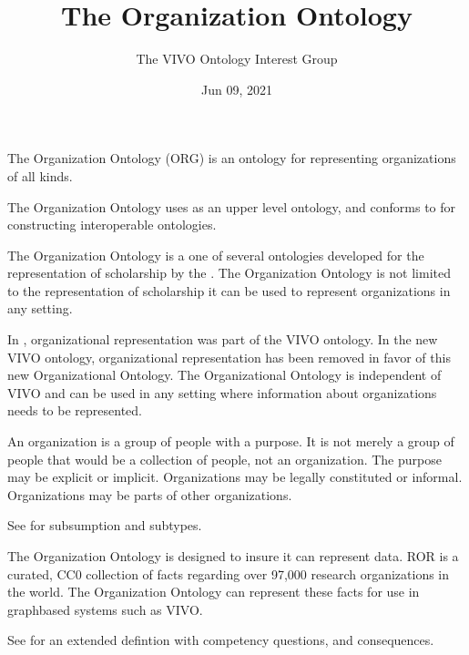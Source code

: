 \documentclass[letterpaper,10pt,english]{sphinxmanual}
\title{The Organization Ontology}
\date{Jun 09, 2021}
\author{The VIVO Ontology Interest Group}
\begin{document}
\pagestyle{empty}
\sphinxmaketitle
\pagestyle{plain}
\sphinxtableofcontents
\pagestyle{normal}
\label{\detokenize{index::doc}}


\sphinxAtStartPar
The Organization Ontology (ORG) is an ontology for
representing organizations of all kinds.

\sphinxAtStartPar
The Organization Ontology uses  as an upper level ontology, and conforms to
 for constructing interoperable ontologies.

\sphinxAtStartPar
The Organization
Ontology is a one of several ontologies developed for the representation of
scholarship by the . The Organization Ontology is
not limited to the representation of
scholarship \textendash{} it can be used to represent organizations in any setting.

\sphinxAtStartPar
In {\hyperref[\detokenize{glossary:glossary}]{}}, organizational representation was part of the VIVO
ontology.  In the new VIVO ontology, organizational
representation has been removed in favor of this new Organizational Ontology.  The
Organizational Ontology
is independent of VIVO and
can be used in any setting where information about organizations needs to be
represented.

\sphinxAtStartPar
An organization is a group of people with a purpose. It is not merely a group of
people \textendash{} that would be a collection of people, not an organization. The purpose
may be explicit or implicit. Organizations may be legally constituted or informal.
Organizations may be parts of other organizations.

\sphinxAtStartPar
See {\hyperref[\detokenize{organizations:organizations}]{}} for subsumption and subtypes.

\sphinxAtStartPar
The Organization Ontology is designed to insure it can represent
 data. ROR is a curated, CC0
collection of facts regarding over 97,000 research organizations in the world. The
Organization Ontology can represent these facts for use in graph\sphinxhyphen{}based systems such
as VIVO.

\sphinxAtStartPar
See {\hyperref[\detokenize{domain-definition:domain-definition}]{}} for an extended defintion with
competency questions,
and consequences.
\end{document}
